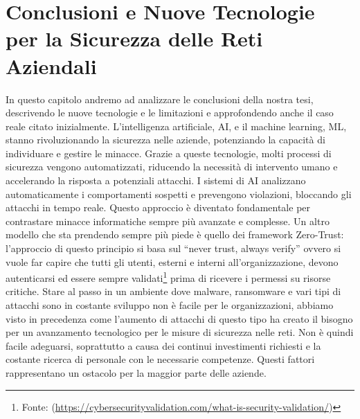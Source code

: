 \hypersetup{linkcolor=blue, citecolor=red}

\chapter{Conclusioni e Nuove Tecnologie per la Sicurezza delle Reti Aziendali} \label{chap:5}
    In questo capitolo andremo ad analizzare le conclusioni della nostra tesi, descrivendo le nuove tecnologie e le limitazioni e approfondendo anche il caso reale citato inizialmente.
    L'intelligenza artificiale, AI, e il machine learning, ML, stanno rivoluzionando la sicurezza nelle aziende, potenziando la capacità di individuare e gestire le minacce. Grazie a queste tecnologie, molti processi di sicurezza vengono automatizzati, riducendo la necessità di intervento umano e accelerando la risposta a potenziali attacchi. I sistemi di AI analizzano automaticamente i comportamenti sospetti e prevengono violazioni, bloccando gli attacchi in tempo reale. Questo approccio è diventato fondamentale per contrastare minacce informatiche sempre più avanzate e complesse. Un altro modello che sta prendendo sempre più piede è quello dei framework Zero-Trust: l'approccio di questo principio si basa sul “never trust, always verify” ovvero si vuole far capire che tutti gli utenti, esterni e interni all'organizzazione, devono autenticarsi ed essere sempre validati\footnote{Fonte: (\url{https://cybersecurityvalidation.com/what-is-security-validation/})} prima di ricevere i permessi su risorse critiche. 
    Stare al passo in un ambiente dove malware, ransomware e vari tipi di attacchi sono in costante sviluppo non è facile per le organizzazioni, abbiamo visto in precedenza come l'aumento di attacchi di questo tipo ha creato il bisogno per un avanzamento tecnologico per le misure di sicurezza nelle reti. Non è quindi facile adeguarsi, soprattutto a causa dei continui investimenti richiesti e la costante ricerca di personale con le necessarie competenze. Questi fattori rappresentano un ostacolo per la maggior parte delle aziende. 

    \newpage
    
